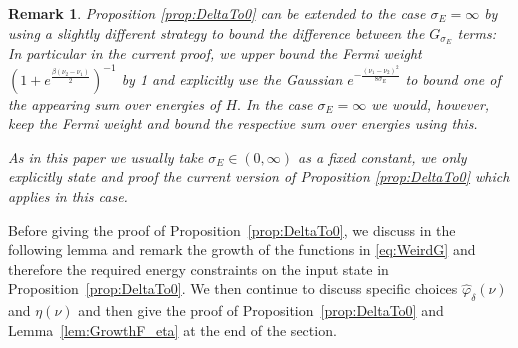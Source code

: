 \documentclass[11pt]{amsart}
\newcommand{\1}{\mathbbm{1}}
\renewcommand{\phi}{\varphi}
\theoremstyle{plain}
\newtheorem{remark}[theorem]{Remark}
\theoremstyle{definition}
\theoremstyle{remark}
\numberwithin{equation}{section}
\begin{document}
\begin{remark}
Proposition \ref{prop:DeltaTo0} can be extended to the case $\sigma_E=\infty$ by using a slightly different strategy to bound the difference between the $G_{\sigma_E}$ terms: In particular in the current proof, we upper bound the Fermi weight $(1+e^{\frac{\beta(\nu_2-\nu_1)}{2}})^{-1}$ by 1 and explicitly use the Gaussian $e^{-\frac{(\nu_1-\nu_2)^2}{8\sigma_E}}$ to bound one of the appearing sum over energies of $H.$ In the case $\sigma_E =\infty$ we would, however, keep the Fermi weight and bound the respective sum over energies using this. 

As in this paper we usually take $\sigma_E \in(0,\infty)$ as a fixed constant, we only explicitly state and proof the current version of Proposition \ref{prop:DeltaTo0} which applies in this case.
\end{remark}
Before giving the proof of Proposition~\ref{prop:DeltaTo0}, we discuss in the following lemma and remark the growth of the functions in \eqref{eq:WeirdG} and therefore the required energy constraints on the input state in Proposition~\ref{prop:DeltaTo0}.  We then continue to discuss specific choices $\widehat \phi_\delta(\nu)$ and $\eta(\nu)$ and then give the proof of Proposition~\ref{prop:DeltaTo0} and Lemma~\ref{lem:GrowthF_eta} at the end of the section.
\end{document}
